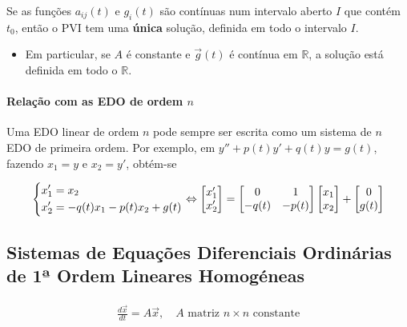 \documentclass{article}
\begin{document}
Se as funções $a_{ij}(t)$ e $g_i(t)$ são contínuas num intervalo aberto $I$ que contém $t_0$, então o PVI
tem uma \textbf{única} solução, definida em todo o intervalo $I$.

\begin{itemize}
    \item Em particular, se $A$ é constante e $\vec{g}(t)$ é contínua em $\mathbb{R}$, a solução está
    definida em todo o $\mathbb{R}$.
\end{itemize}

\paragraph{Relação com as EDO de ordem $n$}

Uma EDO linear de ordem $n$ pode sempre ser escrita como um sistema de $n$ EDO de primeira ordem.
Por exemplo, em $y'' + p(t)y' + q(t)y = g(t)$, fazendo $x_1 = y$ e $x_2 = y'$, obtém-se

\begin{gather*}
\begin{dcases}
x_1' = x_2 \\
x_2' = -q(t)x_1 - p(t)x_2 + g(t)
\end{dcases}
\Leftrightarrow
\begin{bmatrix}
x_1' \\
x_2'
\end{bmatrix}
=
\begin{bmatrix}
0 & 1 \\
-q(t) & -p(t)
\end{bmatrix}
\begin{bmatrix}
x_1 \\
x_2
\end{bmatrix}
+
\begin{bmatrix}
0 \\
g(t)
\end{bmatrix}
\end{gather*}

\bigskip

\subsection{Sistemas de Equações Diferenciais Ordinárias de 1ª Ordem Lineares Homogéneas}
\label{subsec: sistemas-edo-ordem1-lineares-homogeneos}

\begin{gather*}
\boxed{\frac{d\vec{x}}{dt} = A\vec{x}, \quad A \text{ matriz } n \times n \text{ constante}}
\end{gather*}
\end{document}
